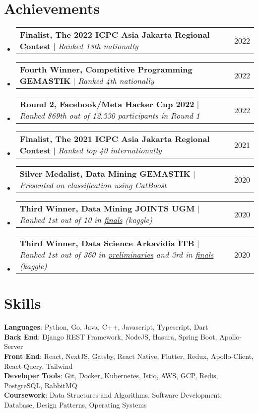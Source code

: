 \documentclass[letterpaper,11pt]{article}
\makeatletter
\newcommand{\resumeProjectHeading}[2]{
    \item
    \begin{tabular*}{\textwidth}{l@{\extracolsep{\fill}}r}
      \small#1 & #2 \\
    \end{tabular*}\vspace{-7pt}
}
\newcommand{\resumeSubHeadingListStart}{\begin{itemize}[leftmargin=0in, label={}]}
\newcommand{\resumeSubHeadingListEnd}{\end{itemize}}
\makeatother
\begin{document}
\section{Achievements}
    \resumeSubHeadingListStart
    \resumeProjectHeading
          {\textbf{Finalist, The 2022 ICPC Asia Jakarta Regional Contest}
          $|$ \emph{Ranked 18th nationally}}{2022}
    \resumeProjectHeading
          {\textbf{Fourth Winner, Competitive Programming GEMASTIK}
          $|$ \emph{Ranked 4th nationally}}{2022}
      \resumeProjectHeading
          {\textbf{Round 2, Facebook/Meta Hacker Cup 2022}
          $|$ \emph{Ranked 869th out of 12.330 participants in Round 1}}{2022}
    \resumeProjectHeading
          {\textbf{Finalist, The 2021 ICPC Asia Jakarta Regional Contest}
          $|$ \emph{Ranked top 40 internationally}}{2021}
      \resumeProjectHeading
          {\textbf{Silver Medalist, Data Mining GEMASTIK}
          $|$ \emph{Presented on classification using CatBoost}}{2020}
      \resumeProjectHeading
          {\textbf{Third Winner, Data Mining JOINTS UGM}
          $|$ \emph{Ranked 1st out of 10 in \href{https://www.kaggle.com/c/final-dm-2020/leaderboard}{finals} (kaggle)}}{2020}
      \resumeProjectHeading
          {\textbf{Third Winner, Data Science Arkavidia ITB}
          $|$ \emph{Ranked 1st out of 360 in \href{https://www.kaggle.com/c/datavidia2019v2/leaderboard}{preliminaries} and 3rd in \href{https://www.kaggle.com/c/finaldatavidia2019/leaderboard}{finals} (kaggle)}}{2020}
    \resumeSubHeadingListEnd

\section{Skills}
 \begin{itemize}[leftmargin=0in, label={}]
    \small{\item{
     \textbf{Languages}{: Python, Go, Java, C++, Javascript, Typescript, Dart} \\
     \textbf{Back End}{: Django REST Framework, NodeJS, Hasura, Spring Boot, Apollo-Server} \\
     \textbf{Front End}{: React, NextJS, Gatsby, React Native, Flutter, Redux, Apollo-Client, React-Query, Tailwind} \\
     \textbf{Developer Tools}{: Git, Docker, Kubernetes, Istio, AWS, GCP, Redis, PostgreSQL, RabbitMQ} \\
     \textbf{Coursework}{: Data Structures and Algorithms, Software Development, Database, Design Patterns, Operating Systems}
    }}
 \end{itemize}


\end{document}
